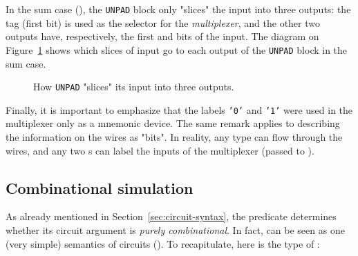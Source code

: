             In the sum case (), the \texttt{UNPAD} block only "slices" the input into three outputs:
            the tag (first bit) is used as the selector for the \emph{multiplexer}, and the other two outputs
            have, respectively, the first  and  bits of the input.
            The diagram on Figure~\ref{fig:semantics-syn-unpad} shows which slices of input go to each
            output of the \texttt{UNPAD} block in the sum case.

            \begin{figure}[h]
                \caption{How \texttt{UNPAD} "slices" its input into three outputs.\label{fig:semantics-syn-unpad}}
            \end{figure}

            Finally, it is important to emphasize that the labels \texttt{'0'} and \texttt{'1'}
            were used in the multiplexer only as a mnemonic device.
            The same remark applies to describing the information on the wires as "bits".
            In reality, any  type can flow through the wires, and any two s
            can label the inputs of the multiplexer (passed to ).


        \subsection{Combinational simulation}
        \label{subsec:combinational-eval}
            As already mentioned in Section~\ref{sec:circuit-syntax},
            the  predicate determines whether its circuit argument is \emph{purely combinational}.
            In fact,  can be seen as one (very simple) semantics of circuits ().
            To recapitulate, here is the type of :

            \begin{center}
            \end{center}

